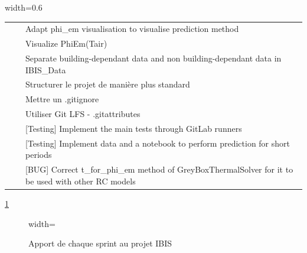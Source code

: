 \begin{table}[H]
\begin{adjustbox}{width=0.6\textwidth}
\begin{tabular}{p{5cm}p{5cm}p{8cm}}
                &
                &
                Adapt phi\_em visualisation to visualise prediction method \\

                &
                &
                Visualize PhiEm(Tair) \\

                &
                &
                Separate building-dependant data and non building-dependant data in IBIS\_Data \\

                &
                &
                Structurer le projet de manière plus standard \\

                &
                &
                Mettre un .gitignore \\

                &
                &
                Utiliser Git LFS - .gitattributes \\

                &
                &
                    {[Testing]} Implement the main tests through GitLab runners \\

                &
                &
                    {[Testing]} Implement data and a notebook to perform prediction for short periods \\

                &
                &
                    {[BUG]} Correct t\_for\_phi\_em method of GreyBoxThermalSolver for it to be used with other RC models \\

                \bottomrule
            \end{tabular}
        \end{adjustbox}
        \label{tab:issuesstatesimple}
    \end{table}

    \ref{fig:IBIS_timeline}

    \begin{figure}[H]
        \centering
        \begin{adjustbox}{width=\textwidth}
        {\fbox{
            
        }}
        \end{adjustbox}
        \caption{Apport de chaque sprint au projet IBIS}\label{fig:IBIS_timeline}
    \end{figure}

